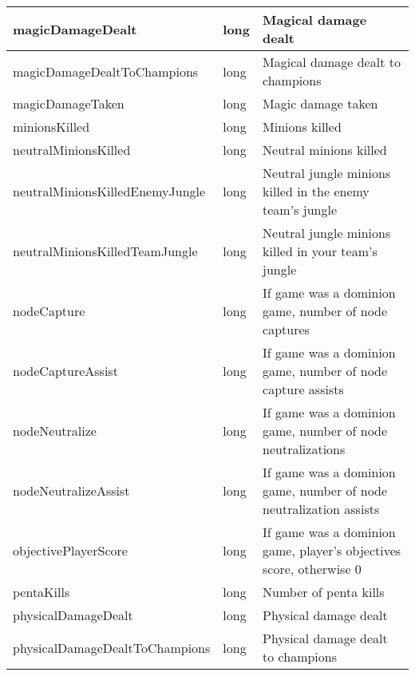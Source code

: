 \begin{table}[!htb]
\begin{tabular}{|llp{5cm}|}
magicDamageDealt                & long               & Magical damage dealt                                                            \\ \hline
magicDamageDealtToChampions     & long               & Magical damage dealt to champions                                               \\ \hline
magicDamageTaken                & long               & Magic damage taken                                                              \\ \hline
minionsKilled                   & long               & Minions killed                                                                  \\ \hline
neutralMinionsKilled            & long               & Neutral minions killed                                                          \\ \hline
neutralMinionsKilledEnemyJungle & long               & Neutral jungle minions killed in the enemy team's jungle                        \\ \hline
neutralMinionsKilledTeamJungle  & long               & Neutral jungle minions killed in your team's jungle                             \\ \hline
nodeCapture                     & long               & If game was a dominion game, number of node captures                            \\ \hline
nodeCaptureAssist               & long               & If game was a dominion game, number of node capture assists                     \\ \hline
nodeNeutralize                  & long               & If game was a dominion game, number of node neutralizations                     \\ \hline
nodeNeutralizeAssist            & long               & If game was a dominion game, number of node neutralization assists              \\ \hline
objectivePlayerScore            & long               & If game was a dominion game, player's objectives score, otherwise 0             \\ \hline
pentaKills                      & long               & Number of penta kills                                                           \\ \hline
physicalDamageDealt             & long               & Physical damage dealt                                                           \\ \hline
physicalDamageDealtToChampions  & long               & Physical damage dealt to champions                                              \\ \hline

\end{tabular}
\end{table}
